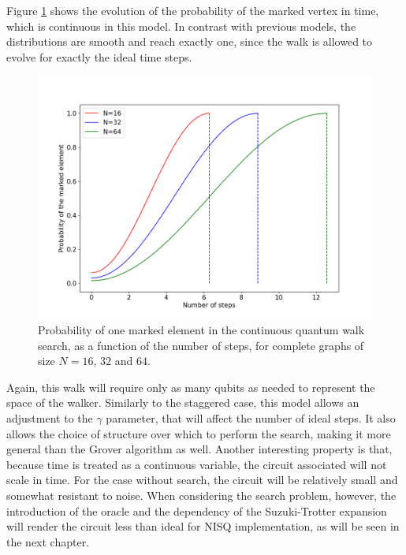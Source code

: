 \documentclass[../../dissertation.tex]{subfiles}
\begin{document}
Figure \ref{fig:ContSearchProbDist} shows the evolution of the probability of the
marked vertex in time, which is continuous in this model. In contrast with
previous models, the distributions are smooth and reach exactly one, since the
walk is allowed to evolve for exactly the ideal time steps.
\begin{figure}[!t]
	\centering \includegraphics[scale=0.40]{img/ContQuantumWalk/Search/163264.png}
	\caption{Probability of one marked element in the continuous quantum walk search, as a function of the number of steps, for complete graphs of size $N=16$, $32$ and $64$.}\label{fig:ContSearchProbDist}
\end{figure}\par

Again, this walk will require only as many qubits as needed to represent the
space of the walker. Similarly to the staggered case, this model allows an
adjustment to the $\gamma$ parameter, that will affect the number of ideal
steps. It also allows the choice of structure over which to perform the
search, making it more general than the Grover algorithm as well. Another
interesting property is that, because time is treated as a continuous variable,
the circuit associated will not scale in time. For the case without
search, the circuit will be relatively small and somewhat resistant to noise.
When considering the search problem, however, the introduction of the oracle
and the dependency of the Suzuki-Trotter expansion will render the circuit less
than ideal for NISQ implementation, as will be seen in the next chapter.
\end{document}

